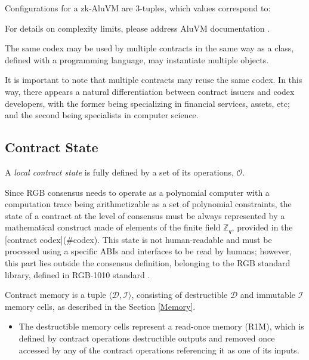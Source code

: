 \documentclass[a4paper]{article}
\begin{document}
\begin{multicols}{2}

Configurations for a zk-AluVM are 3-tuples, which values correspond to:

For details on complexity limits, please address AluVM documentation \cite{AluVM}.

The same codex may be used by multiple contracts in the same way as a class,
defined with a programming language, may instantiate multiple objects.

It is important to note that multiple contracts may reuse the same codex.
In this way, there appears a natural differentiation between contract issuers and codex developers,
with the former being specializing in financial services, assets, etc;
and the second being specialists in computer science.


\subsection{Contract State}

A \emph{local contract state} is fully defined by a set of its operations, $\mathcal{O}$.

Since RGB consensus needs to operate as a polynomial computer with a computation trace being
arithmetizable as a set of polynomial constraints, the state of a contract at the level of
consensus must be always represented by a mathematical construct
made of elements of the finite field $\mathbb{Z}_q$, provided in the [contract codex](#codex).
This state is not human-readable and must be processed using a specific ABIs and interfaces
to be read by humans; however, this part lies outside the consensus definition, belonging
to the RGB standard library, defined in RGB-1010 standard \cite{RGB1010}.

Contract memory is a tuple $\langle \mathcal{D}, \mathcal{I} \rangle$,
consisting of destructible $\mathcal{D}$ and immutable $\mathcal{I}$ memory cells,
as described in the Section \ref{Memory}.

\begin{itemize}
\item The destructible memory cells represent a \gls{read-once memory} (R1M),
  which is defined by contract operations destructible outputs and removed once accessed
  by any of the contract operations referencing it as one of its inputs.


\end{itemize}
\end{multicols}
\end{document}
